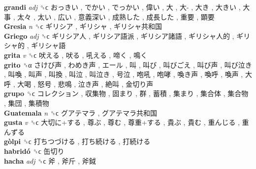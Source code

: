 \textbf{grandi} \emph{adj}  ␝ϲ   おっきい ,  でかい ,  でっかい ,  偉い ,  大 ,  大- ,  大き ,  大きい ,  大事 ,  太々 ,  太い ,  広い ,  意義深い ,  成熟した ,  成長した ,  重要 ,  顕要   \\
\textbf{Gresia} \emph{n}  ␝ϲ   ギリシア ,  ギリシャ ,  ギリシャ共和国   \\
\textbf{Griego} \emph{adj}  ␝ϲ   ギリシア人 ,  ギリシア語派 ,  ギリシア諸語 ,  ギリシャ人的 ,  ギリシャ的 ,  ギリシャ語   \\
\textbf{grita} \emph{v}  ␝ϲ   吠える ,  吠る ,  吼える ,  啼く ,  鳴く   \\
\textbf{grito} ␝α   さけび声 ,  わめき声 ,  エール ,  叫 ,  叫び ,  叫びごえ ,  叫び声 ,  叫び泣き ,  叫喚 ,  叫声 ,  叫換 ,  叫泣 ,  叫泣き ,  号泣 ,  咆吼 ,  咆哮 ,  喚き声 ,  喚呼 ,  喚声 ,  大呼 ,  大喝 ,  怒号 ,  悲鳴 ,  泣き声 ,  絶叫 ,  金切り声   \\
\textbf{grupo} ␝ϲ   コレクション ,  収集物 ,  固まり ,  群 ,  蓄積 ,  集まり ,  集合体 ,  集合物 ,  集団 ,  集積物   \\
\textbf{Guatemala} \emph{n}  ␝ϲ   グアテマラ ,  グアテマラ共和国   \\
\textbf{gusta} \emph{v}  ␝ϲ   大切に+する ,  尊ぶ ,  尊む ,  尊重+する ,  貴ぶ ,  貴む ,  重んじる ,  重んずる   \\
\textbf{gòlpi} ␝ϲ   打ちつづける ,  打ち続ける ,  打続ける   \\
\textbf{habridó} ␝ϲ   缶切り   \\
\textbf{hacha} \emph{adj}  ␝ϲ   斧 ,  斧斤 ,  斧鉞   \\
